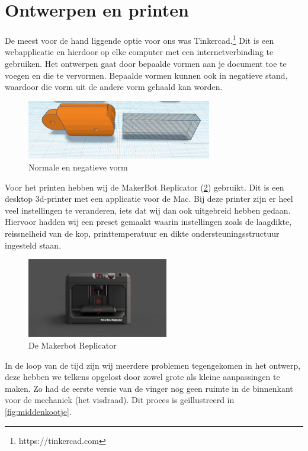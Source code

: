 \hypertarget{ontwerpen-en-printen}{%
\section{Ontwerpen en printen}\label{ontwerpen-en-printen}}

De meest voor de hand liggende optie voor ons was Tinkercad.\footnote{https://tinkercad.com}
Dit is een webapplicatie en hierdoor op elke computer met een
internetverbinding te gebruiken. Het ontwerpen gaat door bepaalde vormen
aan je document toe te voegen en die te vervormen. Bepaalde vormen
kunnen ook in negatieve stand, waardoor die vorm uit de andere vorm
gehaald kan worden.

\begin{figure}
\centering
\includegraphics[width=0.72\textwidth,height=\textheight]{img/image_17.png}
\caption{Normale en negatieve vorm\label{fig:tinkercad}}
\end{figure}

Voor het printen hebben wij de MakerBot Replicator
(\cref{fig:makerbot}) gebruikt. Dit is een desktop
3d-printer met een applicatie voor de Mac. Bij deze printer zijn er heel
veel instellingen te veranderen, iets dat wij dan ook uitgebreid hebben
gedaan. Hiervoor hadden wij een preset gemaakt waarin instellingen zoals
de laagdikte, reissnelheid van de kop, printtemperatuur en dikte
ondersteuningsstructuur ingesteld staan.

\begin{figure}
\centering
\includegraphics[width=0.55\textwidth,height=\textheight]{img/image_18.jpg}
\caption{De Makerbot Replicator\label{fig:makerbot}}
\end{figure}

In de loop van de tijd zijn wij meerdere problemen tegengekomen in het
ontwerp, deze hebben we telkens opgelost door zowel grote als kleine
aanpassingen te maken. Zo had de eerste versie van de vinger nog geen
ruimte in de binnenkant voor de mechaniek (het visdraad). Dit proces is
geïllustreerd in \cref{fig:middenkootje}.

